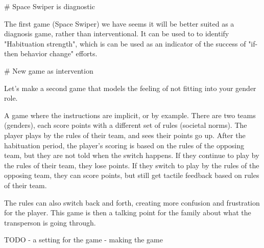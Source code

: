# Space Swiper is diagnostic

The first game (Space Swiper) we have seems it will be better suited as a diagnosis game, rather than interventional.
It can be used to to identify "Habituation strength", which is can be used as an indicator of the success of "if-then behavior change" efforts.


# New game as intervention

Let's make a second game that models the feeling of not fitting into your gender role.

A game where the instructions are implicit, or by example.
There are two teams (genders), each score points with a different set of rules (societal norms).
The player plays by the rules of their team, and sees their points go up.
After the habituation period, the player's scoring is based on the rules of the opposing team, but they are not told when the switch happens.
If they continue to play by the rules of their team, they lose points.
If they switch to play by the rules of the opposing team, they can score points, but still get tactile feedback based on rules of their team.

The rules can also switch back and forth, creating more confusion and frustration for the player.
This game is then a talking point for the family about what the transperson is going through. 

TODO
- a setting for the game
- making the game
